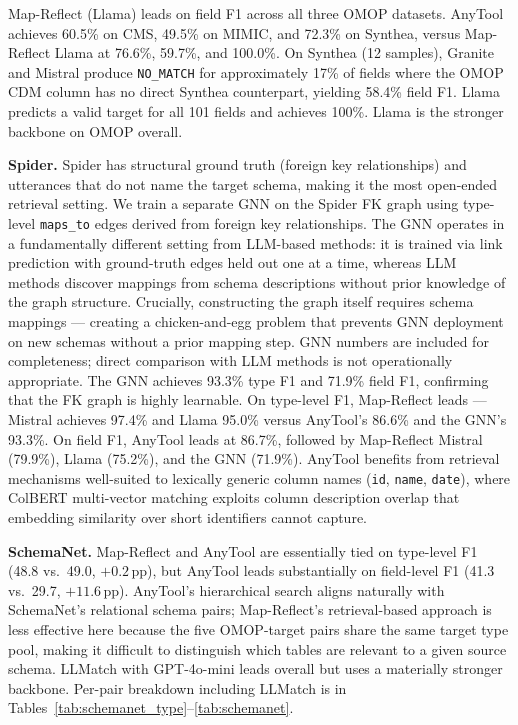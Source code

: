 \documentclass[sigconf, nonacm]{acmart}
\begin{document}
Map-Reflect (Llama) leads on field F1 across all three OMOP datasets. AnyTool achieves 60.5\% on CMS, 49.5\% on MIMIC, and 72.3\% on Synthea, versus Map-Reflect Llama at 76.6\%, 59.7\%, and 100.0\%. On Synthea (12 samples), Granite and Mistral produce \texttt{NO\_MATCH} for approximately 17\% of fields where the OMOP CDM column has no direct Synthea counterpart, yielding 58.4\% field F1. Llama predicts a valid target for all 101 fields and achieves 100\%. Llama is the stronger backbone on OMOP overall.

\textbf{Spider.} Spider has structural ground truth (foreign key relationships) and utterances that do not name the target schema, making it the most open-ended retrieval setting. We train a separate GNN on the Spider FK graph using type-level \texttt{maps\_to} edges derived from foreign key relationships. The GNN operates in a fundamentally different setting from LLM-based methods: it is trained via link prediction with ground-truth edges held out one at a time, whereas LLM methods discover mappings from schema descriptions without prior knowledge of the graph structure. Crucially, constructing the graph itself requires schema mappings — creating a chicken-and-egg problem that prevents GNN deployment on new schemas without a prior mapping step. GNN numbers are included for completeness; direct comparison with LLM methods is not operationally appropriate. The GNN achieves 93.3\% type F1 and 71.9\% field F1, confirming that the FK graph is highly learnable. On type-level F1, Map-Reflect leads — Mistral achieves 97.4\% and Llama 95.0\% versus AnyTool's 86.6\% and the GNN's 93.3\%. On field F1, AnyTool leads at 86.7\%, followed by Map-Reflect Mistral (79.9\%), Llama (75.2\%), and the GNN (71.9\%). AnyTool benefits from retrieval mechanisms well-suited to lexically generic column names (\texttt{id}, \texttt{name}, \texttt{date}), where ColBERT multi-vector matching exploits column description overlap that embedding similarity over short identifiers cannot capture.

\textbf{SchemaNet.} Map-Reflect and AnyTool are essentially tied on type-level F1 (48.8 vs.\ 49.0, $+0.2$\,pp), but AnyTool leads substantially on field-level F1 (41.3 vs.\ 29.7, $+11.6$\,pp). AnyTool's hierarchical search aligns naturally with SchemaNet's relational schema pairs; Map-Reflect's retrieval-based approach is less effective here because the five OMOP-target pairs share the same target type pool, making it difficult to distinguish which tables are relevant to a given source schema. LLMatch with GPT-4o-mini leads overall but uses a materially stronger backbone. Per-pair breakdown including LLMatch is in Tables~\ref{tab:schemanet_type}--\ref{tab:schemanet}.
\end{document}
